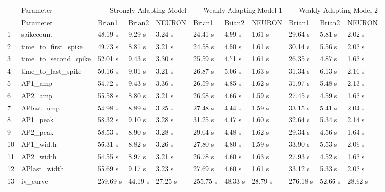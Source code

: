 \begin{tabular}{lllllllllll}
 & Parameter & \multicolumn{3}{r}{Strongly Adapting Model} & \multicolumn{3}{r}{Weakly Adapting Model 1} & \multicolumn{3}{r}{Weakly Adapting Model 2} \\
 & Parameter & Brian1 & Brian2 & NEURON & Brian1 & Brian2 & NEURON & Brian1 & Brian2 & NEURON \\
1 & spikecount & 48.19 s & 9.29 s & 3.24 s & 24.41 s & 4.99 s & 1.61 s & 29.64 s & 5.81 s & 2.02 s \\
2 & time_to_first_spike & 49.73 s & 8.81 s & 3.21 s & 24.58 s & 4.50 s & 1.61 s & 30.14 s & 5.56 s & 2.03 s \\
3 & time_to_second_spike & 52.01 s & 9.43 s & 3.30 s & 25.59 s & 4.71 s & 1.61 s & 26.35 s & 4.87 s & 1.63 s \\
4 & time_to_last_spike & 50.16 s & 9.01 s & 3.21 s & 26.87 s & 5.06 s & 1.63 s & 31.34 s & 6.13 s & 2.10 s \\
5 & AP1_amp & 54.72 s & 9.43 s & 3.36 s & 26.59 s & 4.85 s & 1.62 s & 31.97 s & 5.48 s & 2.13 s \\
6 & AP2_amp & 55.58 s & 8.80 s & 3.21 s & 26.98 s & 4.66 s & 1.59 s & 27.45 s & 4.59 s & 1.63 s \\
7 & APlast_amp & 54.98 s & 8.89 s & 3.25 s & 27.48 s & 4.44 s & 1.59 s & 33.15 s & 5.41 s & 2.04 s \\
8 & AP1_peak & 58.32 s & 9.10 s & 3.28 s & 31.25 s & 4.47 s & 1.60 s & 32.64 s & 5.34 s & 2.14 s \\
9 & AP2_peak & 58.53 s & 8.90 s & 3.28 s & 29.04 s & 4.48 s & 1.62 s & 29.34 s & 4.56 s & 1.64 s \\
10 & AP1_width & 56.31 s & 8.82 s & 3.26 s & 27.80 s & 4.80 s & 1.59 s & 33.90 s & 5.53 s & 2.09 s \\
11 & AP2_width & 54.55 s & 8.97 s & 3.21 s & 26.78 s & 4.60 s & 1.63 s & 27.93 s & 4.52 s & 1.63 s \\
12 & APlast_width & 55.69 s & 9.17 s & 3.23 s & 27.69 s & 4.60 s & 1.61 s & 33.12 s & 5.33 s & 2.03 s \\
13 & iv_curve & 259.69 s & 44.19 s & 27.25 s & 255.75 s & 48.33 s & 28.79 s & 276.18 s & 52.66 s & 28.92 s \\
\end{tabular}
